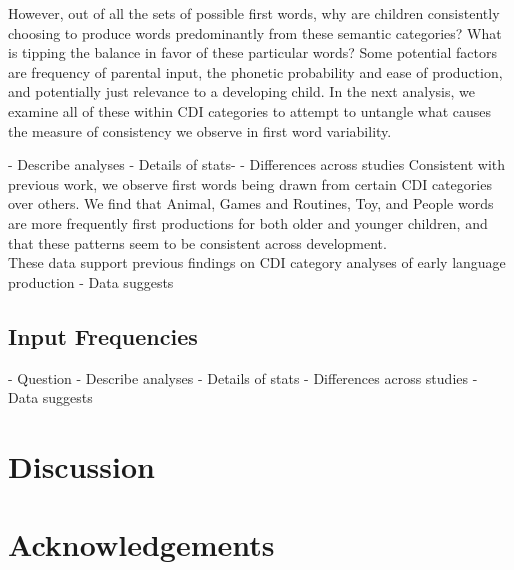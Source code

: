 \documentclass[10pt,letterpaper]{article}
\begin{document}
However, out of all the sets of possible first words, why are children consistently choosing to produce words predominantly from these semantic categories? What is tipping the balance in favor of these particular words? Some potential factors are frequency of parental input, the phonetic probability and ease of production, and potentially just relevance to a developing child. In the next analysis, we examine all of these within CDI categories to attempt to untangle what causes the measure of consistency we observe in first word variability.


- Describe analyses
- Details of stats- 
- Differences across studies
Consistent with previous work, we observe first words being drawn from certain CDI categories over others. We find that Animal, Games and Routines, Toy, and People words are more frequently first productions for both older and younger children, and that these patterns seem to be consistent across development. \\
These data support previous findings on CDI category analyses of early language production 
- Data suggests

\subsection{Input Frequencies}
- Question
- Describe analyses
- Details of stats
- Differences across studies
- Data suggests

\section{Discussion}

\section{Acknowledgements}




\setlength{\bibleftmargin}{.125in}
\setlength{\bibindent}{-\bibleftmargin}


\end{document}
